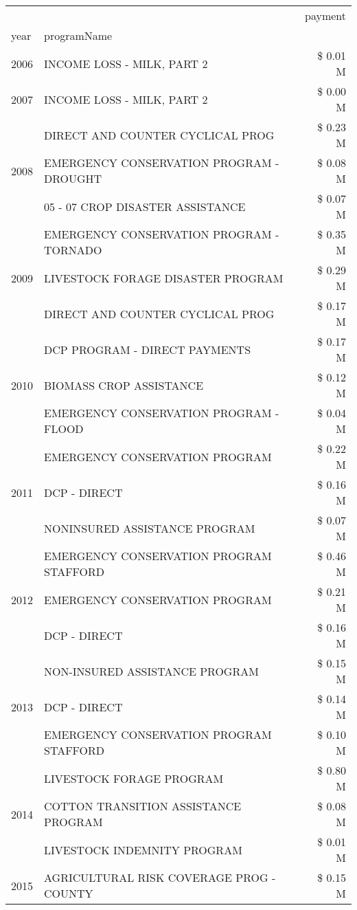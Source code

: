 \begin{tabular}{llr}
\toprule
 &  & payment \\
year & programName &  \\
\midrule
2006 & INCOME LOSS - MILK, PART 2 & \$ 0.01 M \\
\cline{1-3}
2007 & INCOME LOSS - MILK, PART 2 & \$ 0.00 M \\
\cline{1-3}
\multirow[t]{3}{*}{2008} & DIRECT AND COUNTER CYCLICAL PROG & \$ 0.23 M \\
 & EMERGENCY CONSERVATION PROGRAM - DROUGHT & \$ 0.08 M \\
 & 05 - 07 CROP DISASTER ASSISTANCE & \$ 0.07 M \\
\cline{1-3}
\multirow[t]{3}{*}{2009} & EMERGENCY CONSERVATION PROGRAM - TORNADO & \$ 0.35 M \\
 & LIVESTOCK FORAGE DISASTER  PROGRAM & \$ 0.29 M \\
 & DIRECT AND COUNTER CYCLICAL PROG & \$ 0.17 M \\
\cline{1-3}
\multirow[t]{3}{*}{2010} & DCP PROGRAM - DIRECT PAYMENTS & \$ 0.17 M \\
 & BIOMASS CROP ASSISTANCE & \$ 0.12 M \\
 & EMERGENCY CONSERVATION PROGRAM - FLOOD & \$ 0.04 M \\
\cline{1-3}
\multirow[t]{3}{*}{2011} & EMERGENCY CONSERVATION PROGRAM & \$ 0.22 M \\
 & DCP - DIRECT & \$ 0.16 M \\
 & NONINSURED ASSISTANCE PROGRAM & \$ 0.07 M \\
\cline{1-3}
\multirow[t]{3}{*}{2012} & EMERGENCY CONSERVATION PROGRAM STAFFORD & \$ 0.46 M \\
 & EMERGENCY CONSERVATION PROGRAM & \$ 0.21 M \\
 & DCP - DIRECT & \$ 0.16 M \\
\cline{1-3}
\multirow[t]{3}{*}{2013} & NON-INSURED ASSISTANCE PROGRAM & \$ 0.15 M \\
 & DCP - DIRECT & \$ 0.14 M \\
 & EMERGENCY CONSERVATION PROGRAM STAFFORD & \$ 0.10 M \\
\cline{1-3}
\multirow[t]{3}{*}{2014} & LIVESTOCK FORAGE PROGRAM & \$ 0.80 M \\
 & COTTON TRANSITION ASSISTANCE PROGRAM & \$ 0.08 M \\
 & LIVESTOCK INDEMNITY PROGRAM & \$ 0.01 M \\
\cline{1-3}
\multirow[t]{3}{*}{2015} & AGRICULTURAL RISK COVERAGE PROG - COUNTY & \$ 0.15 M \\

\end{tabular}
